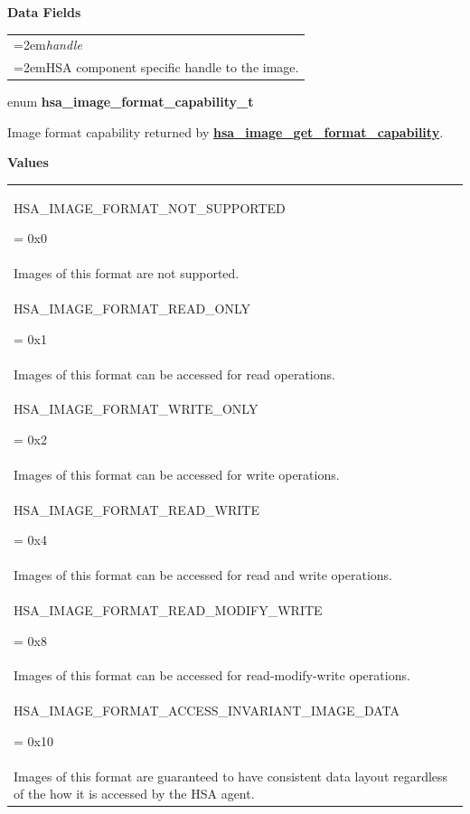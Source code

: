 \documentclass[final]{book}
\newcommand{\reffun}[1]{\textbf{#1}}
\newcommand{\reffld}[1]{\textit{#1}}
\newcommand{\reftyp}[1]{#1}
\newcommand{\refenu}[1]{\reftyp{#1}}
\begin{document}
\begin{appendices}
\noindent\textbf{Data Fields}\\[-6mm]
\begin{longtable}{@{}>{\hangindent=2em}p{\textwidth}}
\reffld{handle}\\\hspace{2em}HSA component specific handle to the image.
\end{longtable}



\noindent\begin{tcolorbox}[nobeforeafter,arc=0mm,colframe=white,colback=lightgray,left=0mm]
enum \hypertarget{group--images-1gab8be837beba5ecf84b757d5a5c1b80d5}{\textbf{hsa_image_format_capability_t}}
\end{tcolorbox}
Image format capability returned by \hyperlink{group--images-1ga48e525e1be37d9ac4e4f6f6a422b3b11}{\reffun{hsa_image_get_format_capability}}.

\noindent\textbf{Values}\\[-5mm]
\begin{longtable}{@{\hspace{2em}}p{\linewidth-2em}}
\hspace{-2em}\hypertarget{group--images-1ggab8be837beba5ecf84b757d5a5c1b80d5a703a9a5c6687b16e1fa2faf1895dd38c}{\refenu{HSA_IMAGE_FORMAT_NOT_SUPPORTED}} = 0x0\\Images of this format are not supported.\\[2mm]
\hspace{-2em}\hypertarget{group--images-1ggab8be837beba5ecf84b757d5a5c1b80d5ad9f78af2f41439e4cf468a78aa0d210b}{\refenu{HSA_IMAGE_FORMAT_READ_ONLY}} = 0x1\\Images of this format can be accessed for read operations.\\[2mm]
\hspace{-2em}\hypertarget{group--images-1ggab8be837beba5ecf84b757d5a5c1b80d5adaddb4579e55610d8c77bedab5a2010f}{\refenu{HSA_IMAGE_FORMAT_WRITE_ONLY}} = 0x2\\Images of this format can be accessed for write operations.\\[2mm]
\hspace{-2em}\hypertarget{group--images-1ggab8be837beba5ecf84b757d5a5c1b80d5a72b5faaca2a20331f258661accafab46}{\refenu{HSA_IMAGE_FORMAT_READ_WRITE}} = 0x4\\Images of this format can be accessed for read and write operations.\\[2mm]
\hspace{-2em}\hypertarget{group--images-1ggab8be837beba5ecf84b757d5a5c1b80d5a3b87a70c657bb3eb575e32ebe24f4df1}{\refenu{HSA_IMAGE_FORMAT_READ_MODIFY_WRITE}} = 0x8\\Images of this format can be accessed for read-modify-write operations.\\[2mm]
\hspace{-2em}\hypertarget{group--images-1ggab8be837beba5ecf84b757d5a5c1b80d5a8a70c7d8e7727e621217a246d38e4f0b}{\refenu{HSA_IMAGE_FORMAT_ACCESS_INVARIANT_IMAGE_DATA}} = 0x10\\Images of this format are guaranteed to have consistent data layout regardless of the how it is accessed by the HSA agent.
\end{longtable}


\end{appendices}
\end{document}
